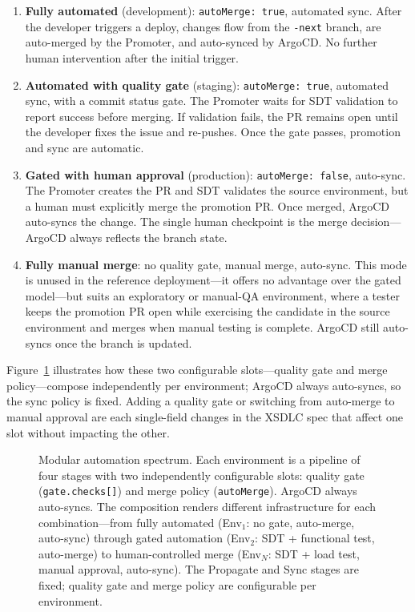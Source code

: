 \begin{enumerate}
    \item \textbf{Fully automated} (development): \texttt{autoMerge: true}, automated sync. After the developer triggers a deploy, changes flow from the \texttt{-next} branch, are auto-merged by the Promoter, and auto-synced by ArgoCD. No further human intervention after the initial trigger.
    \item \textbf{Automated with quality gate} (staging): \texttt{autoMerge: true}, automated sync, with a commit status gate. The Promoter waits for SDT validation to report success before merging. If validation fails, the PR remains open until the developer fixes the issue and re-pushes. Once the gate passes, promotion and sync are automatic.
    \item \textbf{Gated with human approval} (production): \texttt{autoMerge: false}, auto-sync. The Promoter creates the PR and SDT validates the source environment, but a human must explicitly merge the promotion PR. Once merged, ArgoCD auto-syncs the change. The single human checkpoint is the merge decision---ArgoCD always reflects the branch state.
    \item \textbf{Fully manual merge}: no quality gate, manual merge, auto-sync. This mode is unused in the reference deployment---it offers no advantage over the gated model---but suits an exploratory or manual-QA environment, where a tester keeps the promotion PR open while exercising the candidate in the source environment and merges when manual testing is complete. ArgoCD still auto-syncs once the branch is updated.
\end{enumerate}

Figure~\ref{fig:human-in-the-loop} illustrates how these two configurable slots---quality gate and merge policy---compose independently per environment; ArgoCD always auto-syncs, so the sync policy is fixed. Adding a quality gate or switching from auto-merge to manual approval are each single-field changes in the XSDLC spec that affect one slot without impacting the other.

\begin{figure}[htbp]
\centering
\resizebox{\textwidth}{!}{%
%
}
\caption{Modular automation spectrum. Each environment is a pipeline of four stages with two independently configurable slots: quality gate (\texttt{gate.checks[]}) and merge policy (\texttt{autoMerge}). ArgoCD always auto-syncs. The composition renders different infrastructure for each combination---from fully automated (Env$_1$: no gate, auto-merge, auto-sync) through gated automation (Env$_2$: SDT + functional test, auto-merge) to human-controlled merge (Env$_N$: SDT + load test, manual approval, auto-sync). The Propagate and Sync stages are fixed; quality gate and merge policy are configurable per environment.}
\label{fig:human-in-the-loop}
\end{figure}

